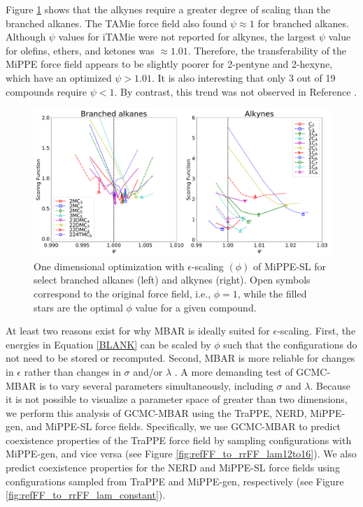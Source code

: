 \documentclass[journal=jced,manuscript=article]{achemso}
\begin{document}
Figure \ref{fig:epsilon_scaling} shows that the alkynes require a greater degree of scaling than the branched alkanes. The TAMie force field also found $\psi \approx 1$ for branched alkanes. Although $\psi$ values for iTAMie were not reported for alkynes, the largest $\psi$ value for olefins, ethers, and ketones was $\approx 1.01$. Therefore, the transferability of the MiPPE force field appears to be slightly poorer for 2-pentyne and 2-hexyne, which have an optimized $\psi > 1.01$. It is also interesting that only 3 out of 19 compounds require $\psi < 1$. By contrast, this trend was not observed in Reference . 


	\begin{figure}[htb!]
		\centering
		\includegraphics[width=6.4in]{Optimal_epsilon_scaling.pdf}
		\caption{One dimensional optimization with $\epsilon$-scaling $(\phi)$ of MiPPE-SL for select branched alkanes (left) and alkynes (right). Open symbols correspond to the original force field, i.e., $\phi = 1$, while the filled stars are the optimal $\phi$ value for a given compound.}
		\label{fig:epsilon_scaling}
	\end{figure}

 
At least two reasons exist for why MBAR is ideally suited for $\epsilon$-scaling. First, the energies in Equation \ref{BLANK} can be scaled by $\phi$ such that the configurations do not need to be stored or recomputed. Second, MBAR is more reliable for changes in $\epsilon$ rather than changes in $\sigma$ and/or $\lambda$ \cite{Postdoc_1}. A more demanding test of GCMC-MBAR is to vary several parameters simultaneously, including $\sigma$ and $\lambda$. Because it is not possible to visualize a parameter space of greater than two dimensions, we perform this analysis of GCMC-MBAR using the TraPPE, NERD, MiPPE-gen, and MiPPE-SL force fields. Specifically, we use GCMC-MBAR to predict coexistence properties of the TraPPE force field by sampling configurations with MiPPE-gen, and vice versa (see Figure \ref{fig:refFF_to_rrFF_lam12to16}). We also predict coexistence properties for the NERD and MiPPE-SL force fields using configurations sampled from TraPPE and MiPPE-gen, respectively (see Figure \ref{fig:refFF_to_rrFF_lam_constant}).
\end{document}

